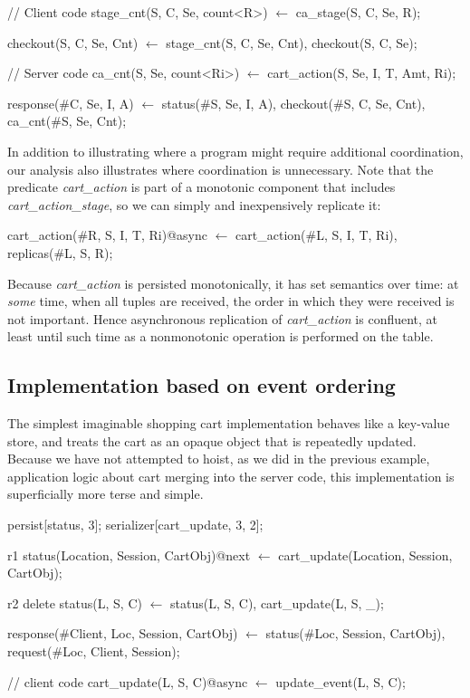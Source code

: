 \begin{Dedalus}
// Client code
stage_cnt(S, C, Se, count<R>) \(\leftarrow\)
  ca_stage(S, C, Se, R);

checkout(S, C, Se, Cnt) \(\leftarrow\)
  stage_cnt(S, C, Se, Cnt),
  checkout(S, C, Se);

// Server code
ca_cnt(S, Se, count<Ri>) \(\leftarrow\) 
  cart_action(S, Se, I, T, Amt, Ri);

response(#C, Se, I, A) \(\leftarrow\)
  status(#S, Se, I, A), 
  checkout(#S, C, Se, Cnt),
  ca_cnt(#S, Se, Cnt);

\end{Dedalus}


In addition to illustrating where a program might require additional coordination, our
analysis also illustrates where coordination is unnecessary.
Note that the predicate {\em cart\_action} is part of a monotonic component that includes {\em cart\_action\_stage}, 
so we can simply and inexpensively replicate it:

\begin{Dedalus}
cart_action(#R, S, I, T, Ri)@async \(\leftarrow\)
    cart_action(#L, S, I, T, Ri),
    replicas(#L, S, R);
\end{Dedalus}

Because {\em cart\_action} is persisted monotonically, it has set semantics over time: at
{\em some} time, when all tuples are received, the order in which they were received is
not important.  Hence asynchronous replication of {\em cart\_action} is confluent,
at least until such time as a nonmonotonic operation is performed on the table.


\subsection{Implementation based on event ordering}

The simplest imaginable shopping cart implementation behaves like a key-value store,
and treats the cart as an opaque object that is repeatedly updated.    Because we have not
attempted to hoist, as we did in the previous example, application logic about cart merging
into the server code, this implementation is superficially more terse and simple.

\begin{Dedalus}
persist[status, 3];
serializer[cart_update, 3, 2];

r1
status(Location, Session, CartObj)@next \(\leftarrow\)
    cart_update(Location,  Session, CartObj);
    
r2
delete status(L, S, C) \(\leftarrow\)
    status(L, S, C), cart_update(L, S, _);
  
response(#Client, Loc, Session, CartObj) \(\leftarrow\)
    status(#Loc, Session, CartObj),
    request(#Loc, Client, Session);

// client code
cart_update(L, S, C)@async \(\leftarrow\) 
    update_event(L, S, C);
\end{Dedalus}


